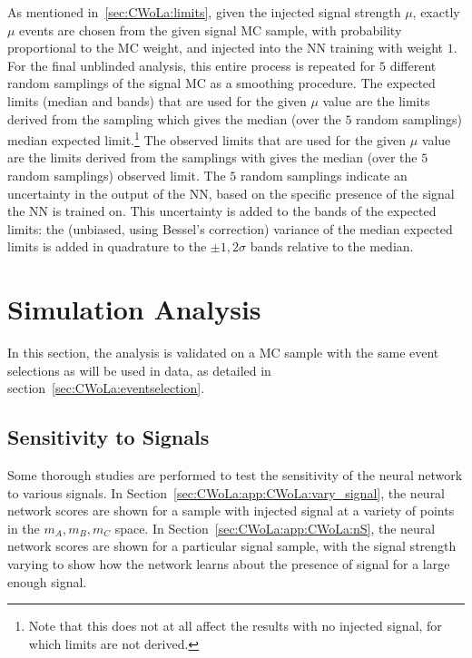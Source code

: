 As mentioned in~\ref{sec:CWoLa:limits}, given the injected signal strength $\mu$, exactly $\mu$ events are chosen from the given signal MC sample, with probability proportional to the MC weight, and injected into the NN training with weight $1$.
For the final unblinded analysis, this entire process is repeated for $5$ different random samplings of the signal MC as a smoothing procedure.
The expected limits (median and bands) that are used for the given $\mu$ value are the limits derived from the sampling which gives the median (over the $5$ random samplings) median expected limit.\footnote{Note that this does not at all affect the results with no injected signal, for which limits are not derived.}
The observed limits that are used for the given $\mu$ value are the limits derived from the samplings with gives the median (over the $5$ random samplings) observed limit.
The $5$ random samplings indicate an uncertainty in the output of the NN, based on the specific presence of the signal the NN is trained on.
This uncertainty is added to the bands of the expected limits:
the (unbiased, using Bessel's correction) variance of the median expected limits is added in quadrature to the $\pm 1,2\sigma$ bands relative to the median.

\section{Simulation Analysis}
\label{sec:CWoLa:simulation_analysis}
In this section, the analysis is validated on a MC sample with the same event selections as will be used in data, as detailed in section~\ref{sec:CWoLa:eventselection}.

\subsection{Sensitivity to Signals}

Some thorough studies are performed to test the sensitivity of the neural network to various signals.
In Section~\ref{sec:CWoLa:app:CWoLa:vary_signal}, the neural network scores are shown for a sample with injected signal at a variety of points in the $m_A,m_B,m_C$ space.
In Section~\ref{sec:CWoLa:app:CWoLa:nS}, the neural network scores are shown for a particular signal sample, with the signal strength varying to show how the network learns about the presence of signal for a large enough signal.

